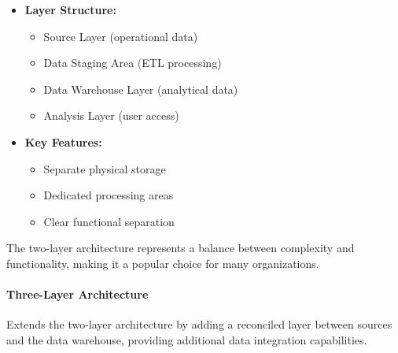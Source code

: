 \documentclass[a4paper,11pt]{article}
\newcommand{\definition}[1]{
  \begin{tcolorbox}[colback=blue!5,colframe=blue!40!black,title=Definition]
    #1
  \end{tcolorbox}
}
\newcommand{\note}[1]{
  \begin{tcolorbox}[colback=green!5,colframe=green!40!black,title=Note]
    #1
  \end{tcolorbox}
}
\begin{document}
\begin{itemize}
    \item \textbf{Layer Structure:}
        \begin{itemize}
            \item Source Layer (operational data)
            \item Data Staging Area (ETL processing)
            \item Data Warehouse Layer (analytical data)
            \item Analysis Layer (user access)
        \end{itemize}
    \item \textbf{Key Features:}
        \begin{itemize}
            \item Separate physical storage
            \item Dedicated processing areas
            \item Clear functional separation
        \end{itemize}
\end{itemize}

\note{
The two-layer architecture represents a balance between complexity and functionality, making it a popular choice for many organizations.
}

\paragraph{Three-Layer Architecture}
\definition{
Extends the two-layer architecture by adding a reconciled layer between sources and the data warehouse, providing additional data integration capabilities.
}
\end{document}
